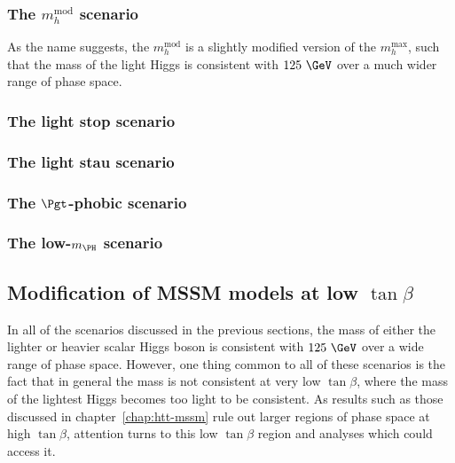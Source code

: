 \subsubsection{The $m_{h}^{\text{mod}}$ scenario}
\label{sec:mhmodscenario}

As the name suggests, the $m_{h}^{\text{mod}}$ is a slightly modified version of
the $m_{h}^{\text{max}}$, such that the mass of the light Higgs is consistent
with $125~\GeV$ over a much wider range of phase space.

\subsubsection{The light stop scenario}
\label{sec:lightstopscenario}

\subsubsection{The light stau scenario}
\label{sec:lightstauscenario}

\subsubsection{The $\Pgt$-phobic scenario}
\label{sec:tauphobicscenario}

\subsubsection{The low-$m_{\PH}$ scenario}
\label{sec:lowmHscenario}

\subsection{Modification of MSSM models at low $\tan\beta$}
\label{sec:lowtanbscenario}

In all of the scenarios discussed in the previous sections, the mass of either
the lighter or heavier scalar Higgs boson is consistent with $125~\GeV$ over a
wide range of phase space. However, one thing common to all of these scenarios
is the fact that in general the mass is not consistent at very low $\tan\beta$,
where the mass of the lightest Higgs becomes too light to be consistent. As
results such as those discussed in chapter~\ref{chap:htt-mssm} rule out larger
regions of phase space at high $\tan\beta$, attention turns to this low
$\tan\beta$ region and analyses which could access it. 


